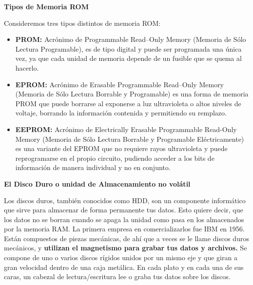 \documentclass[10pt,letterpaper]{article}
\begin{document}
\begin{justify}
	\begin{center}
		\textbf{Tipos de Memoria ROM}
	\end{center}
	
	\noindent
	Consideremos tres tipos distintos de memoria ROM:\\
	
	\begin{itemize}
		\item \textbf{PROM:} Acrónimo de Programmable Read–Only Memory (Memoria de Sólo Lectura Programable), es de tipo digital y puede ser programada una única vez, ya que cada unidad de memoria depende de un fusible que se quema al hacerlo.
		
		\item \textbf{EPROM:} Acrónimo de Erasable Programmable Read–Only Memory (Memoria de Sólo Lectura Borrable y Programable) es una forma de memoria PROM que puede borrarse al exponerse a luz ultravioleta o altos niveles de voltaje, borrando la información contenida y permitiendo su remplazo.
		
		\item \textbf{EEPROM:} Acrónimo de Electrically Erasable Programmable Read-Only Memory (Memoria de Sólo Lectura Borrable y Programable Eléctricamente) es una variante del EPROM que no requiere rayos ultravioleta y puede reprogramarse en el propio circuito, pudiendo acceder a los bits de información de manera individual y no en conjunto.
	\end{itemize}

	\newpage
	\begin{center}
		\textbf{El Disco Duro o unidad de Almacenamiento no volátil}	
	\end{center}
	
	\noindent
	Los discos duros, también conocidos como HDD, son un componente informático que sirve para almacenar de forma permanente tus datos. Esto quiere decir, que los datos no se borran cuando se apaga la unidad como pasa en los almacenados por la memoria RAM. La primera empresa en comercializarlos fue IBM en 1956.\cite{quinta} \\
	
	\noindent
	Están compuestos de piezas mecánicas, de ahí que a veces se le llame discos duros mecánicos, y \textbf{utilizan el magnetismo para grabar tus datos y archivos.} Se compone de uno o varios discos rígidos unidos por un mismo eje y que giran a gran velocidad dentro de una caja metálica. En cada plato y en cada una de sus caras, un cabezal de lectura/escritura lee o graba tus datos sobre los discos. \\
	

\end{justify}
\end{document}
